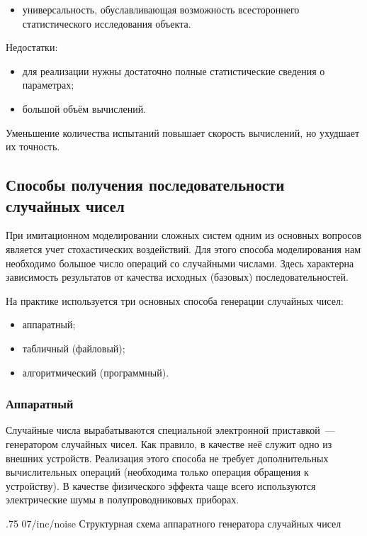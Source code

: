 \begin{itemize}
    \item универсальность, обуславливающая возможность всестороннего статистического исследования объекта.
\end{itemize}

Недостатки:

\begin{itemize}
    \item для реализации нужны достаточно полные статистические сведения о параметрах;
    \item большой объём вычислений.
\end{itemize}

Уменьшение количества испытаний повышает скорость вычислений, но ухудшает их точность.

\subsection{Способы получения последовательности случайных чисел}

При имитационном моделировании сложных систем одним из основных вопросов является учет стохастических воздействий. Для этого способа моделирования нам необходимо большое число операций со случайными числами. Здесь характерна зависимость результатов от качества исходных (базовых) последовательностей.

На практике используется три основных способа генерации случайных чисел:

\begin{itemize}
    \item аппаратный;
    \item табличный (файловый);
    \item алгоритмический (программный).
\end{itemize}

\subsubsection{Аппаратный}

Случайные числа вырабатываются специальной электронной приставкой~--- генератором случайных чисел. Как правило, в качестве неё служит одно из внешних устройств. Реализация этого способа не требует дополнительных вычислительных операций (необходима только операция обращения к устройству). В качестве физического эффекта чаще всего используются электрические шумы в полупроводниковых приборах.

\image
{.75\textwidth}
{07/inc/noise}
{Структурная схема аппаратного генератора случайных чисел}


